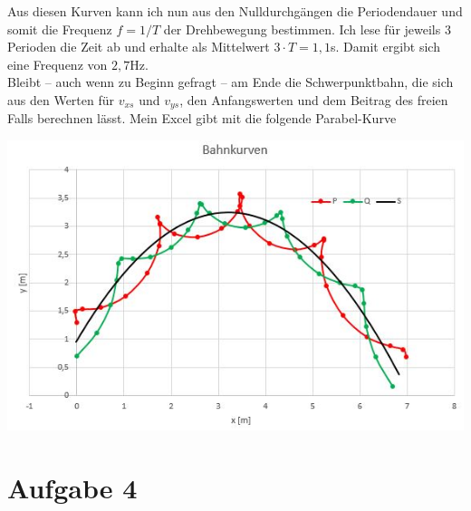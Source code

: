 \documentclass{article}
\begin{document}
Aus diesen Kurven kann ich nun aus den Nulldurchgängen die Periodendauer und somit die 
Frequenz $f=1/T$ der Drehbewegung bestimmen. Ich lese für jeweils 3 Perioden die Zeit ab und erhalte als Mittelwert $3\cdot T=1,1$s.
Damit ergibt sich eine Frequenz von $2,7$Hz.\\
Bleibt -- auch wenn zu Beginn gefragt --  am Ende die Schwerpunktbahn, die sich aus den Werten für $v_{xs}$ und $v_{ys}$, den Anfangswerten und dem Beitrag des freien Falls berechnen lässt.
Mein Excel gibt mit die folgende Parabel-Kurve
\begin{center}
	\includegraphics[scale=0.8]{Schwerpunktbahn.JPG}
\end{center}


\section*{Aufgabe 4}
\end{document}
